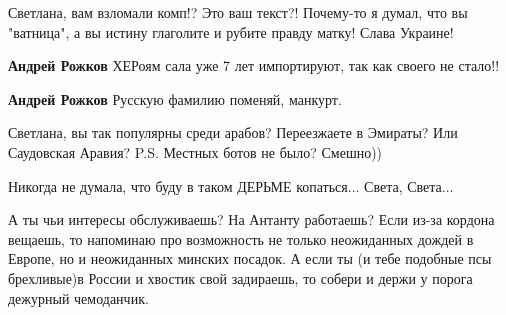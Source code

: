 \begin{itemize}
 
Светлана, вам взломали комп!? Это ваш текст?! Почему-то я думал, что вы
"ватница", а вы истину глаголите и рубите правду матку! Слава Украине!

\begin{itemize}
 
\textbf{Андрей Рожков} ХЕРоям сала уже 7 лет импортируют, так как своего не стало!!

 
\textbf{Андрей Рожков} Русскую фамилию поменяй, манкурт.
\end{itemize}

 
Светлана, вы так популярны среди арабов? Переезжаете в Эмираты? Или Саудовская Аравия?
P.S. Местных ботов не было? Смешно))

 
Никогда не думала, что буду в таком ДЕРЬМЕ копаться... Света, Света...

 

А ты чьи интересы обслуживаешь? На Антанту работаешь? Если из-за кордона
вещаешь, то напоминаю про возможность не только неожиданных дождей в Европе, но
и неожиданных минских посадок. А если ты (и тебе подобные псы брехливые)в
России и хвостик свой задираешь, то собери и держи у порога дежурный
чемоданчик.


\end{itemize}
